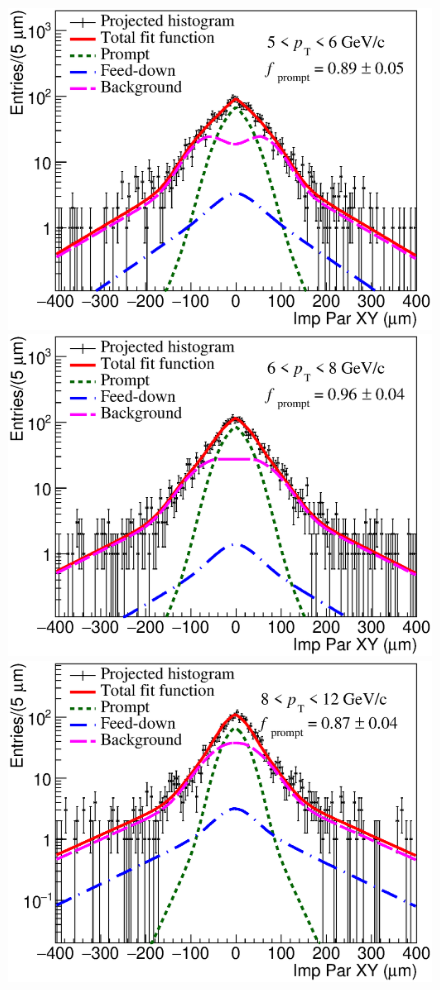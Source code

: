 \documentclass[b5paper,10pt,twoside,oldstyle,classica]{toptesi}
\begin{document}
\begin{figure}[h]
\begin{center}
\hspace{0cm}
{\includegraphics[scale = 0.25]{FitUnbinned_5-6_bkg_plot.eps}}
\vspace{0cm}
{\includegraphics[scale = 0.25]{FitUnbinned_6-8_bkg_plot.eps}}
\hspace{0cm}
{\includegraphics[scale = 0.25]{FitUnbinned_8-12_bkg_plot.eps}}

\end{center}
\end{figure}
\end{document}
